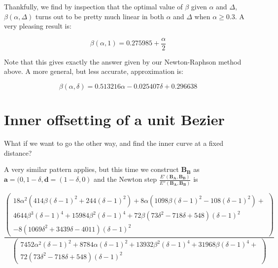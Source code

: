 \documentclass[a4paper]{article}
\newcommand\DrawControl[3]{
  node[#2,circle,fill=#2,inner sep=1pt,label=#3] at #1 {}
}
\begin{document}
Thankfully, we find by inspection that the optimal value of $\beta$ given $\alpha$ and $\Delta$, $\beta(\alpha, \Delta)$ turns out to be pretty much linear in both $\alpha$ and $\Delta$ when $\alpha \ge 0.3$. A very pleasing result is:

\begin{dmath}
\beta(\alpha,1) = 0.275985 + \frac{\alpha}{2}
\end{dmath}

Note that this gives exactly the answer given by our Newton-Raphson method above. A more general, but less accurate, approximation is:

\begin{dmath}\label{approx}
\beta(\alpha, \delta) = 0.513216 \alpha -0.025407 \delta+0.296638
\end{dmath}

\section{Inner offsetting of a unit Bezier}

What if we want to go the other way, and find the inner curve at a fixed distance?

\bigskip
{}
\bigskip

A very similar pattern applies, but this time we construct $\mathbf{B_B}$ as
$\mathbf{a} = (0, 1-\delta, \mathbf{d} = (1-\delta, 0)$
and the Newton step $\frac{E'(\mathbf{B_A},\mathbf{B_B})}{E''(\mathbf{B_A},\mathbf{B_B})}$ is

\begin{dmath}
\frac{\left(
\begin{matrix}
18 \alpha ^2 \left(414 \beta  (\delta -1)^2+244 (\delta -1)^2\right)+8 \alpha  \left(1098 \beta  (\delta -1)^2-108 (\delta -1)^2\right)+ \\
4644 \beta ^3 (\delta -1)^4+15984 \beta ^2 (\delta -1)^4+72 \beta  \left(73 \delta ^2-718 \delta +548\right) (\delta -1)^2 \\
-8 \left(1069 \delta ^2+3439 \delta -4011\right) (\delta -1)^2
\end{matrix}\right)
}{\left(
  \begin{matrix}7452 \alpha ^2 (\delta -1)^2+8784 \alpha  (\delta -1)^2+13932 \beta ^2 (\delta -1)^4+31968 \beta  (\delta -1)^4+ \\
  72 \left(73 \delta ^2-718 \delta +548\right) (\delta -1)^2
  \end{matrix}\right)
}
\end{dmath}
\end{document}
